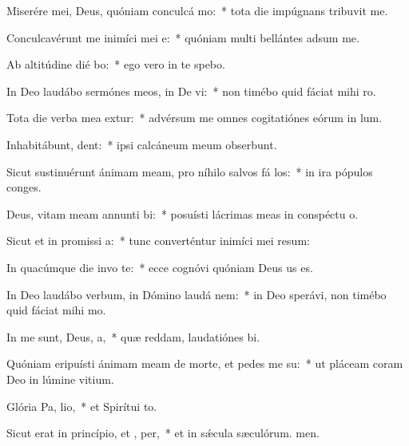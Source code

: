 \item Miserére mei, Deus, quóniam conculcá  mo:~* tota die impúgnans tribuvit me.
\item Conculcavérunt me inimíci mei  e:~* quóniam multi bellántes adsum me.
\item Ab altitúdine dié bo:~* ego vero in te spebo.
\item In Deo laudábo sermónes meos, in De vi:~* non timébo quid fáciat mihi ro.
\item Tota die verba mea extur:~* advérsum me omnes cogitatiónes eórum in lum.
\item Inhabitábunt,  dent:~* ipsi calcáneum meum obserbunt.
\item Sicut sustinuérunt ánimam meam, pro níhilo salvos fá los:~* in ira pópulos conges.
\item Deus, vitam meam annunti bi:~* posuísti lácrimas meas in conspéctu o.
\item Sicut et in promissi a:~* tunc converténtur inimíci mei resum:
\item In quacúmque die invo te:~* ecce cognóvi quóniam Deus us es.
\item In Deo laudábo verbum, in Dómino laudá nem:~* in Deo sperávi, non timébo quid fáciat mihi mo.
\item In me sunt, Deus,  a,~* quæ reddam, laudatiónes bi.
\item Quóniam eripuísti ánimam meam de morte, et pedes me  su:~* ut pláceam coram Deo in lúmine vitium.
\item Glória Pa,  lio,~* et Spirítui to.
\item Sicut erat in princípio, et ,  per,~* et in sǽcula sæculórum. men.

